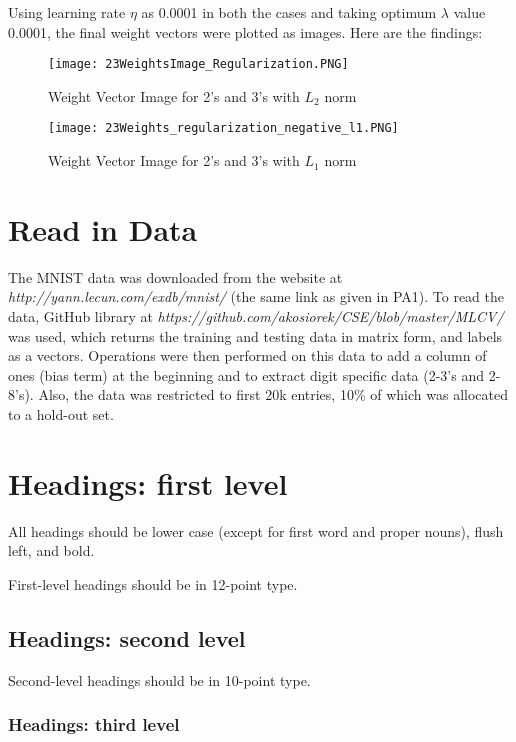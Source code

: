 \documentclass{article}
\begin{document}
Using learning rate $\eta$ as 0.0001 in both the cases and taking optimum $\lambda$ value 0.0001, the final weight vectors were plotted as images. Here are the findings:

\begin{figure}
  \texttt{[image: 23WeightsImage\_Regularization.PNG]}
  \caption{Weight Vector Image for 2's and 3's with $L_{2}$ norm}
  \label{fig:graph 5(e) l2}
\end{figure} 

\begin{figure}
  \texttt{[image: 23Weights\_regularization\_negative\_l1.PNG]}
  \caption{Weight Vector Image for 2's and 3's with $L_{1}$ norm}
  \label{fig:graph 5(e) l1}
\end{figure}

\section{Read in Data}

The MNIST data was downloaded from the website at \emph{http://yann.lecun.com/exdb/mnist/} (the same link as given in PA1). To read the data, GitHub library at \emph{https://github.com/akosiorek/CSE/blob/master/MLCV/} was used, which returns the training and testing data in matrix form, and labels as a vectors. Operations were then performed on this data to add a column of ones (bias term) at the beginning and to extract digit specific data (2-3's and 2-8's). Also, the data was restricted to first 20k entries, 10\% of which was allocated to a hold-out set.

\section{Headings: first level}
\label{headings}

All headings should be lower case (except for first word and proper
nouns), flush left, and bold.

First-level headings should be in 12-point type.

\subsection{Headings: second level}

Second-level headings should be in 10-point type.

\subsubsection{Headings: third level}
\end{document}
